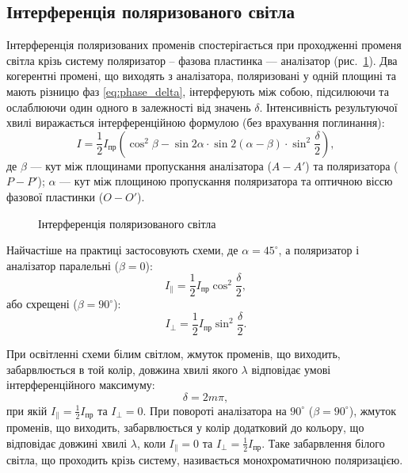 \subsection*{Інтерференція поляризованого світла}


Інтерференція поляризованих променів спостерігається при
проходженні променя світла крізь систему поляризатор – фазова пластинка
--- аналізатор (рис.~\ref{pic:Interferention_of_polarized}). Два когерентні промені, що виходять з аналізатора, поляризовані у одній площині та мають різницю фаз \eqref{eq:phase_delta}, інтерферують між собою, підсилюючи та ослаблюючи один одного в залежності від значень $ \delta $. Інтенсивність результуючої хвилі виражається інтерференційною формулою (без врахування поглинання):
\begin{equation}\label{eq:Interferention_of_polarized}
    I = \frac12 I_\text{пр} \left( \cos^2\beta - \sin2\alpha \cdot \sin2(\alpha-\beta)\cdot\sin^2\frac\delta2\right),
\end{equation}
де $ \beta $ --- кут між площинами пропускання аналізатора ($A - A'$) та поляризатора ($P - P'$); $ \alpha $ --- кут між площиною пропускання поляризатора та оптичною віссю фазової пластинки ($ O - O' $).


\begin{figure}[h!]\centering

\caption{Інтерференція поляризованого світла}
\label{pic:Interferention_of_polarized}
\end{figure}

Найчастіше на практиці застосовують схеми, де $ \alpha = 45^\circ $, а
поляризатор і аналізатор паралельні ($ \beta = 0 $):
\begin{equation}\label{}
    I_\parallel = \frac12 I_\text{пр} \cos^2\frac\delta2,
\end{equation}
або схрещені ($ \beta = 90^\circ $):
\begin{equation}\label{eq:I_perp}
    I_\perp = \frac12 I_\text{пр} \sin^2\frac\delta2.
\end{equation}

При освітленні схеми білим світлом, жмуток променів, що виходить,
забарвлюється в той колір, довжина хвилі якого $ \lambda $ відповідає умові
інтерференційного максимуму:
\begin{equation}\label{}
    \delta = 2m\pi,
\end{equation}
при якій $ I_\parallel = \frac12 I_\text{пр} $ та $I_\perp = 0$. При повороті аналізатора на $ 90^\circ $ ($ \beta = 90^\circ $), жмуток
променів, що виходить, забарвлюється у колір додатковий до кольору, що
відповідає довжині хвилі $ \lambda $, коли $ I_\parallel = 0 $ та $I_\perp = \frac12 I_\text{пр}$. Таке забарвлення білого світла, що проходить крізь систему, називається монохроматичною поляризацією.





